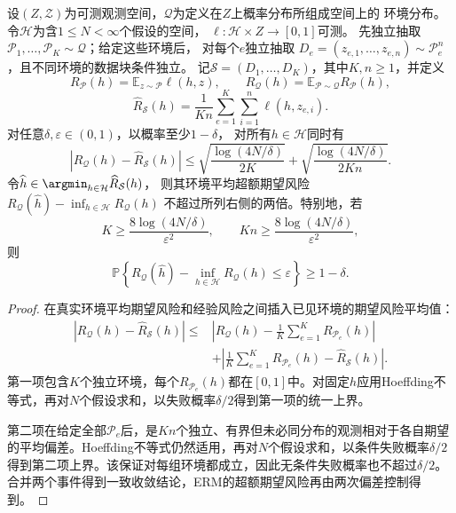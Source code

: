 \begin{theorem}[随机环境中的一致收敛与可学习性]
\label{thm:dg-two-level-sample}
设$(Z,\mathcal Z)$为可测观测空间，$\mathcal Q$为定义在$Z$上概率分布所组成空间上的
环境分布。令$\mathcal H$为含$1\leq N<\infty$个假设的空间，
$\ell:\mathcal H\times Z\to[0,1]$可测。
先独立抽取$\mathcal P_1,\ldots,\mathcal P_K\sim\mathcal Q$；给定这些环境后，
对每个$e$独立抽取
$D_e=(z_{e,1},\ldots,z_{e,n})\sim\mathcal P_e^n$，且不同环境的数据块条件独立。
记$\mathcal S=(D_1,\ldots,D_K)$，其中$K,n\geq1$，并定义
\[
 R_{\mathcal P}(h)=\mathbb E_{z\sim\mathcal P}\ell(h,z),\qquad
 R_{\mathcal Q}(h)=\mathbb E_{\mathcal P\sim\mathcal Q}R_{\mathcal P}(h),
\]
\[
 \widehat R_{\mathcal S}(h)=\frac1{Kn}
 \sum_{e=1}^K\sum_{i=1}^n\ell(h,z_{e,i}).
\]
对任意$\delta,\varepsilon\in(0,1)$，以概率至少$1-\delta$，
对所有$h\in\mathcal H$同时有
\begin{equation}
 |R_{\mathcal Q}(h)-\widehat R_{\mathcal S}(h)|
 \leq\sqrt{\frac{\log(4N/\delta)}{2K}}
      +\sqrt{\frac{\log(4N/\delta)}{2Kn}}.
 \label{eq:dg-two-level-uniform}
\end{equation}
令$\widehat h\in\argmin_{h\in\mathcal H}\widehat R_{\mathcal S}(h)$，
则其环境平均超额期望风险
$R_{\mathcal Q}(\widehat h)-\inf_{h\in\mathcal H}R_{\mathcal Q}(h)$
不超过所列右侧的两倍。特别地，若
\[
 K\geq\frac{8\log(4N/\delta)}{\varepsilon^2},
 \qquad
 Kn\geq\frac{8\log(4N/\delta)}{\varepsilon^2},
\]
则
\[
 \mathbb P\left\{
 R_{\mathcal Q}(\widehat h)-\inf_{h\in\mathcal H}R_{\mathcal Q}(h)
 \leq\varepsilon\right\}\geq1-\delta.
\]
\end{theorem}
\begin{proof}
在真实环境平均期望风险和经验风险之间插入已见环境的期望风险平均值：
\begin{align*}
 |R_{\mathcal Q}(h)-\widehat R_{\mathcal S}(h)|
 \leq{}&\left|R_{\mathcal Q}(h)-\frac1K\sum_{e=1}^K R_{\mathcal P_e}(h)\right|\\
 &+\left|\frac1K\sum_{e=1}^K R_{\mathcal P_e}(h)-\widehat R_{\mathcal S}(h)\right|.
\end{align*}
第一项包含$K$个独立环境，每个$R_{\mathcal P_e}(h)$都在$[0,1]$中。对固定$h$应用Hoeffding不等式，再对$N$个假设求和，以失败概率$\delta/2$得到第一项的统一上界。

第二项在给定全部$\mathcal P_e$后，是$Kn$个独立、有界但未必同分布的观测相对于各自期望的平均偏差。Hoeffding不等式仍然适用，再对$N$个假设求和，以条件失败概率$\delta/2$得到第二项上界。该保证对每组环境都成立，因此无条件失败概率也不超过$\delta/2$。合并两个事件得到一致收敛结论，ERM的超额期望风险再由两次偏差控制得到。
\end{proof}

